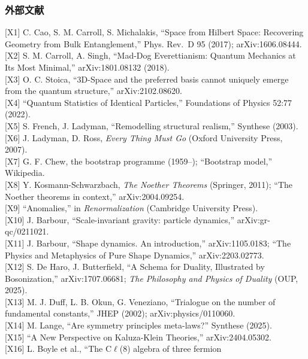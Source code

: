 \documentclass[
  a4paper,
]{ltjsarticle}
\begin{document}
\subsubsection{外部文献}\label{ux5916ux90e8ux6587ux732e}

{[}X1{]} C. Cao, S. M. Carroll, S. Michalakis, ``Space from Hilbert
Space: Recovering Geometry from Bulk Entanglement,'' Phys. Rev.~D 95
(2017); arXiv:1606.08444.\\
{[}X2{]} S. M. Carroll, A. Singh, ``Mad-Dog Everettianism: Quantum
Mechanics at Its Most Minimal,'' arXiv:1801.08132 (2018).\\
{[}X3{]} O. C. Stoica, ``3D-Space and the preferred basis cannot
uniquely emerge from the quantum structure,'' arXiv:2102.08620.\\
{[}X4{]} ``Quantum Statistics of Identical Particles,'' Foundations of
Physics 52:77 (2022).\\
{[}X5{]} S. French, J. Ladyman, ``Remodelling structural realism,''
Synthese (2003).\\
{[}X6{]} J. Ladyman, D. Ross, \emph{Every Thing Must Go} (Oxford
University Press, 2007).\\
{[}X7{]} G. F. Chew, the bootstrap programme (1959--); ``Bootstrap
model,'' Wikipedia.\\
{[}X8{]} Y. Kosmann-Schwarzbach, \emph{The Noether Theorems} (Springer,
2011); ``The Noether theorems in context,'' arXiv:2004.09254.\\
{[}X9{]} ``Anomalies,'' in \emph{Renormalization} (Cambridge University
Press).\\
{[}X10{]} J. Barbour, ``Scale-invariant gravity: particle dynamics,''
arXiv:gr-qc/0211021.\\
{[}X11{]} J. Barbour, ``Shape dynamics. An introduction,''
arXiv:1105.0183; ``The Physics and Metaphysics of Pure Shape Dynamics,''
arXiv:2203.02773.\\
{[}X12{]} S. De Haro, J. Butterfield, ``A Schema for Duality,
Illustrated by Bosonization,'' arXiv:1707.06681; \emph{The Philosophy
and Physics of Duality} (OUP, 2025).\\
{[}X13{]} M. J. Duff, L. B. Okun, G. Veneziano, ``Trialogue on the
number of fundamental constants,'' JHEP (2002); arXiv:physics/0110060.\\
{[}X14{]} M. Lange, ``Are symmetry principles meta-laws?'' Synthese
(2025).\\
{[}X15{]} ``A New Perspective on Kaluza-Klein Theories,''
arXiv:2404.05302.\\
{[}X16{]} L. Boyle et al., ``The C\(\ell\)(8) algebra of three fermion
\end{document}
